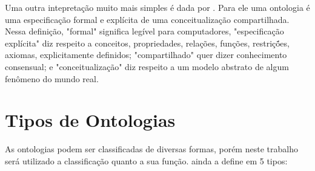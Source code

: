 Uma outra intepretação muito mais simples é dada por 
\cite{borst1997construction}. Para ele uma ontologia é uma especificação formal 
e explícita de uma conceitualização compartilhada. Nessa definição, "formal" 
significa legível para computadores, "especificação explícita" diz respeito a 
conceitos, propriedades, relações, funções, restriçṍes, axiomas, explicitamente 
definidos; "compartilhado" quer dizer conhecimento consensual; e 
"conceitualização" diz respeito a um modelo abstrato de algum fenômeno do mundo 
real.

\section{Tipos de Ontologias}
\label{sec:tipos_de_ontologias}

As ontologias podem ser classificadas de diversas formas, porém neste trabalho
será utilizado a classificação quanto a sua função. \cite{guizzardidesenvolvimento} 
ainda a define em 5 tipos:

